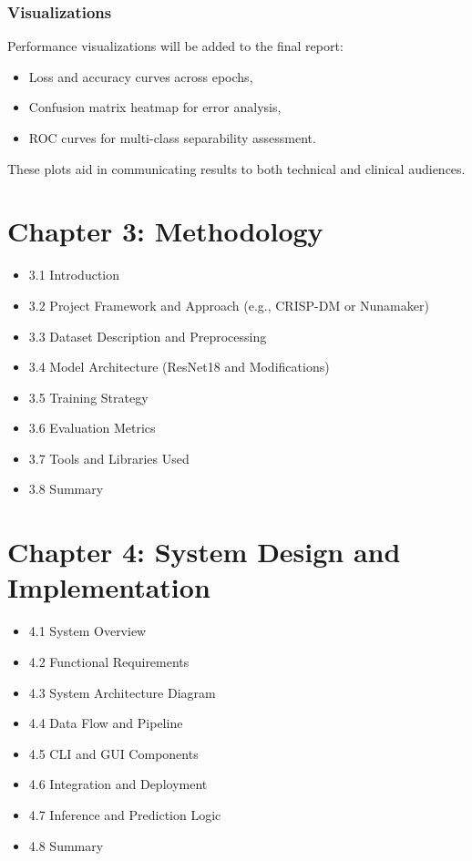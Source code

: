 \documentclass[
  12pt,
  oneside]{article}
\providecommand{\tightlist}{%
  \setlength{\itemsep}{0pt}\setlength{\parskip}{0pt}}
\begin{document}
\subsubsection{Visualizations}\label{visualizations}

Performance visualizations will be added to the final report:

\begin{itemize}
\tightlist
\item
  Loss and accuracy curves across epochs,
\item
  Confusion matrix heatmap for error analysis,
\item
  ROC curves for multi-class separability assessment.
\end{itemize}

These plots aid in communicating results to both technical and clinical
audiences.

\section{Chapter 3: Methodology}\label{chapter-3-methodology-1}

\begin{itemize}
\tightlist
\item
  3.1 Introduction
\item
  3.2 Project Framework and Approach (e.g., CRISP-DM or Nunamaker)
\item
  3.3 Dataset Description and Preprocessing
\item
  3.4 Model Architecture (ResNet18 and Modifications)
\item
  3.5 Training Strategy
\item
  3.6 Evaluation Metrics
\item
  3.7 Tools and Libraries Used
\item
  3.8 Summary
\end{itemize}

\newpage

\section{Chapter 4: System Design and
Implementation}\label{chapter-4-system-design-and-implementation}

\begin{itemize}
\tightlist
\item
  4.1 System Overview
\item
  4.2 Functional Requirements
\item
  4.3 System Architecture Diagram
\item
  4.4 Data Flow and Pipeline
\item
  4.5 CLI and GUI Components
\item
  4.6 Integration and Deployment
\item
  4.7 Inference and Prediction Logic
\item
  4.8 Summary
\end{itemize}
\end{document}
